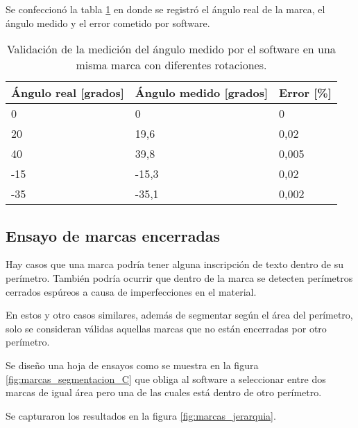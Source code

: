    Se confeccionó la tabla \ref{tbl:marcas_angulos} en donde se registró el ángulo real de la marca, el ángulo medido y el error cometido por software.\par

      \begin{table}[!ht]
         \centering
         \caption[Ensayo de medición de ángulos de marcas.]{Validación de la medición del ángulo medido por el software en una misma marca con diferentes rotaciones.}
         \begin{tabular}[!ht]{m{1.6cm}m{1.6cm}m{1.6cm}}
            \toprule
            \textbf{Ángulo real [grados]} & \textbf{Ángulo medido [grados]} & \textbf{Error [\%]}\\
            \midrule
            {0}   & {0}     & {0}\\
            {20}  & {19,6}  & {0,02}\\
            {40}  & {39,8}  & {0,005}\\
            {-15} & {-15,3} & {0,02}\\
            {-35} & {-35,1} & {0,002}\\
            \bottomrule
         \end{tabular}
         \label{tbl:marcas_angulos}
      \end{table}

\subsection{Ensayo de marcas encerradas}
\label{subsection:marcas_jerarquias}

Hay casos que una marca podría tener alguna inscripción de texto dentro de su perímetro. También podría ocurrir que dentro de la marca se detecten perímetros cerrados espúreos a causa de imperfecciones en el material.\par
En estos y otro casos similares, además de segmentar según el área del perímetro, solo se consideran válidas aquellas marcas que no están encerradas por otro perímetro. \par
Se diseño una hoja de ensayos como se muestra en la figura \ref{fig:marcas_segmentacion_C} que obliga al software a seleccionar entre dos marcas de igual área pero una de las cuales está dentro de otro perímetro.\par
   Se capturaron los resultados en la figura \ref{fig:marcas_jerarquia}.

